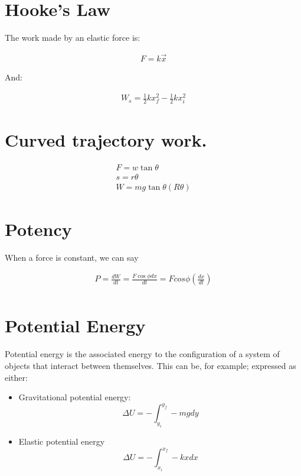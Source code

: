 \documentclass[11pt,fleqn]{book} %
\begin{document}
\section{Hooke's Law}

The work made by an elastic force is:

\begin{gather}
    F = k\vec{x}
\end{gather}

And:

\begin{gather}
W_s = \frac{1}{2}k x_f^2 - \frac{1}{2} k x_i^2
\end{gather}

\section{Curved trajectory work.}

\begin{gather}
    F = w \tan{\theta}\\
    s = r \theta \\
    W = mg \tan{\theta} ( R \theta )
\end{gather}

\section{Potency}

When a force is constant, we can say 

\begin{gather}
    P = \frac{dW}{dt} = \frac{F \cos \phi dx}{dt} = F cos \phi(\frac{dx}{dt})\\
\end{gather}

\section{Potential Energy}

Potential energy is the associated energy to the configuration of
a system of objects that interact between themselves. This can be, for example;
expressed as either:

\begin{itemize}
    \item Gravitational potential energy:
    \begin{equation}
        \Delta U = - \int_{y_i}^{y_f} - mg dy
    \end{equation}
    \item Elastic potential energy
    \begin{equation}
        \Delta U = - \int_{x_i}^{x_f} - kx dx
    \end{equation}
\end{itemize}
\end{document}

